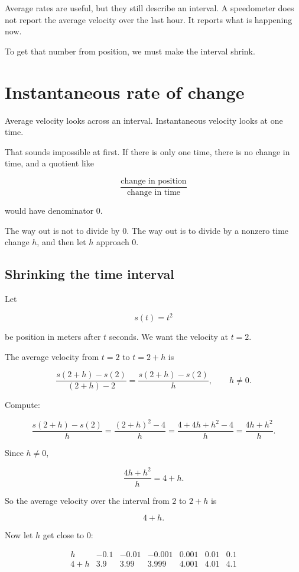 Average rates are useful, but they still describe an interval.  A speedometer does not report the average velocity over the last hour.  It reports what is happening now.

To get that number from position, we must make the interval shrink.

\section{Instantaneous rate of change}
\label{sec:instantaneous-rate-of-change}

Average velocity looks across an interval.  Instantaneous velocity looks at one time.

That sounds impossible at first.  If there is only one time, there is no change in time, and a quotient like

\[
\frac{\text{change in position}}{\text{change in time}}
\]

would have denominator \(0\).

The way out is not to divide by \(0\).  The way out is to divide by a nonzero time change \(h\), and then let \(h\) approach \(0\).

\subsection{Shrinking the time interval}
\label{subsec:shrinking-time-interval}

Let

\[
s(t)=t^2
\]

be position in meters after \(t\) seconds.  We want the velocity at \(t=2\).

The average velocity from \(t=2\) to \(t=2+h\) is

\[
\frac{s(2+h)-s(2)}{(2+h)-2}
=
\frac{s(2+h)-s(2)}{h},
\qquad h\neq0.
\]

Compute:

\[
\frac{s(2+h)-s(2)}{h}
=
\frac{(2+h)^2-4}{h}
=
\frac{4+4h+h^2-4}{h}
=
\frac{4h+h^2}{h}.
\]

Since \(h\neq0\),

\[
\frac{4h+h^2}{h}=4+h.
\]

So the average velocity over the interval from \(2\) to \(2+h\) is

\[
4+h.
\]

Now let \(h\) get close to \(0\):

\[
\begin{array}{c|cccccc}
h & -0.1 & -0.01 & -0.001 & 0.001 & 0.01 & 0.1 \\ \hline
4+h & 3.9 & 3.99 & 3.999 & 4.001 & 4.01 & 4.1
\end{array}
\]


